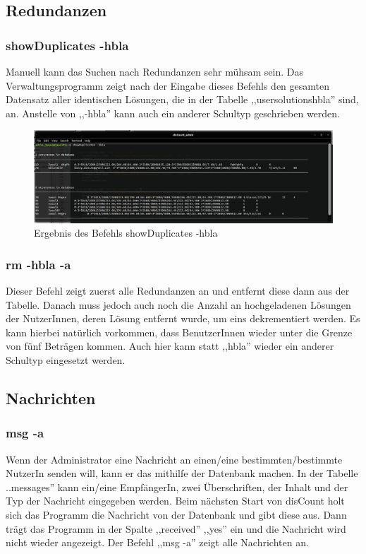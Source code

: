 \documentclass[12pt]{report}
\begin{document}
\subsection{Redundanzen}

\subsubsection{showDuplicates -hbla}
Manuell kann das Suchen nach Redundanzen sehr mühsam sein. Das Verwaltungsprogramm zeigt nach der Eingabe dieses Befehls den gesamten Datensatz aller identischen Lösungen, die in der Tabelle ,,usersolutionshbla'' sind, an. Anstelle von ,,-hbla'' kann auch ein anderer Schultyp geschrieben werden.

\begin{figure}[h]
	\centering
	\includegraphics[width=16.5cm]{images/showDuplicates_hbla}
	\caption[Befehl showDuplicates -hbla]{Ergebnis des Befehls showDuplicates -hbla}
\end{figure}


\subsubsection{rm -hbla -a}
Dieser Befehl zeigt zuerst alle Redundanzen an und entfernt diese dann aus der Tabelle. Danach muss jedoch auch noch die Anzahl an hochgeladenen Lösungen der NutzerInnen, deren Lösung entfernt wurde, um eins dekrementiert werden. Es kann hierbei natürlich vorkommen, dass BenutzerInnen wieder unter die Grenze von fünf Beträgen kommen. Auch hier kann statt ,,hbla'' wieder ein anderer Schultyp eingesetzt werden.

\subsection{Nachrichten}

\subsubsection{msg -a}
Wenn der Administrator eine Nachricht an einen/eine bestimmten/bestimmte NutzerIn senden will, kann er das mithilfe der Datenbank machen. In der Tabelle ..messages'' kann ein/eine EmpfängerIn, zwei Überschriften, der Inhalt und der Typ der Nachricht eingegeben werden. Beim nächsten Start von disCount holt sich das Programm die Nachricht von der Datenbank und gibt diese aus. Dann trägt das Programm in der Spalte ,,received'' ,,yes'' ein und die Nachricht wird nicht wieder angezeigt. Der Befehl ,,msg -a'' zeigt alle Nachrichten an.
\end{document}
